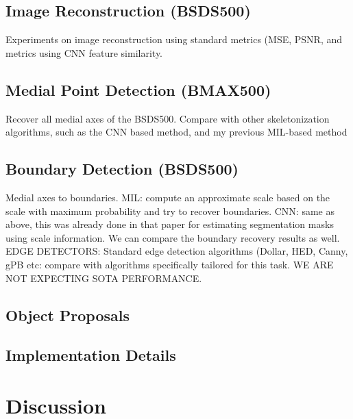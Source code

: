 \documentclass[10pt,twocolumn,letterpaper]{article}
\begin{document}
\subsection{Image Reconstruction (BSDS500)}
Experiments on image reconstruction using standard metrics (MSE, PSNR, and metrics using CNN feature similarity.

\subsection{Medial Point Detection (BMAX500)}\label{sec:medial-point-detection}
Recover all medial axes of the BSDS500. Compare with other skeletonization algorithms, such
as the CNN based method, and my previous MIL-based method

\subsection{Boundary Detection (BSDS500)}\label{sec:boundary-detection}
Medial axes to boundaries. 
MIL: compute an approximate scale based on the scale with maximum probability and try to recover boundaries.
CNN: same as above, this was already done in that paper for estimating segmentation masks using scale information.
We can compare the boundary recovery results as well.
EDGE DETECTORS: Standard edge detection algorithms (Dollar, HED, Canny, gPB etc: compare with algorithms specifically
tailored for this task. WE ARE NOT EXPECTING SOTA PERFORMANCE.

\subsection{Object Proposals}\label{sec:object-proposals}

\subsection{Implementation Details}

\section{Discussion}\label{sec:discussion}

{\small


}
\end{document}
